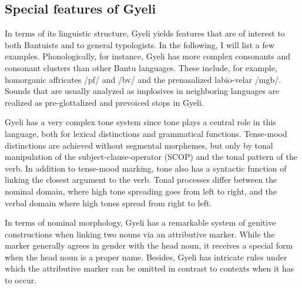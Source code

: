 
\subsection{Special features of Gyeli}


In terms of its linguistic structure, Gyeli yields features that are of interest to both Bantuists and to general typologists. In the following, I will list a few examples. 
Phonologically, for instance, Gyeli has more complex consonants and consonant clusters than other Bantu languages. These include, for example, homorganic affricates /pf/ and /bv/ and the prenasalized labio-velar /mgb/. Sounds that are usually analyzed as implosives in neighboring languages are realized as pre-glottalized and prevoiced stops in Gyeli.

Gyeli has a very complex tone system since tone plays a central role in this language, both for lexical distinctions and grammatical functions. Tense-mood distinctions are achieved without segmental morphemes, but only by tonal manipulation of  the subject-clause-operator (SCOP) and the tonal pattern of the verb. In addition to tense-mood marking, tone also has a syntactic function of linking the closest argument to the verb. Tonal processes differ between the nominal domain, where high tone spreading goes from left to right, and the verbal domain where high tones spread from right to left.

In terms of nominal morphology, Gyeli has a remarkable system of genitive constructions when linking two nouns via an attributive marker. While the marker generally agrees in gender with the head noun, it receives a special form when the head noun is a proper name. Besides, Gyeli has intricate rules under which the attributive marker can be omitted in contrast to contexts when it has to occur.

